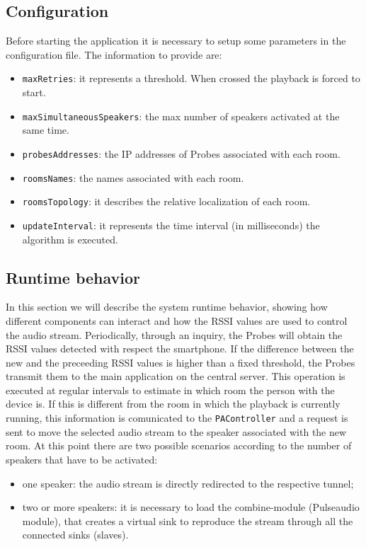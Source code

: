 \documentclass[conference]{IEEEtran}
\begin{document}
\subsection{Configuration}
Before starting the application it is necessary to setup some parameters in the configuration file. The information to provide are:
\begin{itemize}
\item \texttt{maxRetries}: it represents a threshold. When crossed the playback is forced to start.
\item \texttt{maxSimultaneousSpeakers}: the max number of speakers activated at the same time.
\item \texttt{probesAddresses}: the IP addresses of Probes associated with each room.
\item \texttt{roomsNames}: the names associated with each room.
\item \texttt{roomsTopology}: it describes the relative localization of each room. %
\item \texttt{updateInterval}: it represents the time interval (in milliseconds) the algorithm is executed. 
\end{itemize}

\subsection{Runtime behavior}
In this section we will describe the system runtime behavior, showing how different components can interact and how the RSSI values are used to control the audio stream.
Periodically, through an inquiry, the Probes will obtain the RSSI values detected with respect the smartphone. If the difference between the new and the preceeding RSSI values is higher than a fixed threshold, the Probes transmit them to the main application on the central server. This operation is executed at regular intervals to estimate in which room the person with the device is. If this is different from the room in which the playback is currently running, this information is comunicated to the \texttt{PAController} and a request is sent to move the selected audio stream to the speaker associated with the new room. At this point there are two possible scenarios according to the number of speakers that have to be activated:
\begin{itemize}
\item one speaker: the audio stream is directly redirected to the respective tunnel;
\item two or more speakers: it is necessary to load the combine-module (Pulseaudio module), that creates a virtual sink to reproduce the stream through all the connected sinks (slaves).
\end{itemize}
\end{document}
